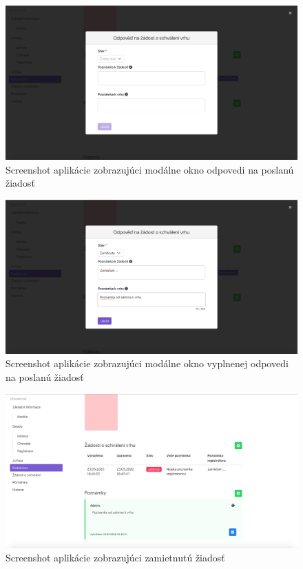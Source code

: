 \vspace*{\fill}

\begin{figure}[H]
	\includegraphics[width=1.0\textwidth]{media/priloha/vrh/ziadost/3.png}
	\caption{Screenshot aplikácie zobrazujúci modálne okno odpovedi na poslanú žiadosť}
\end{figure}

\begin{figure}[H]
	\includegraphics[width=1.0\textwidth]{media/priloha/vrh/ziadost/4.png}
	\caption{Screenshot aplikácie zobrazujúci modálne okno vyplnenej odpovedi na poslanú žiadosť}
\end{figure}

\vspace*{\fill}

\begin{figure}[H]
	\includegraphics[width=1.0\textwidth]{media/priloha/vrh/ziadost/5.png}
	\caption{Screenshot aplikácie zobrazujúci zamietnutú žiadosť}
\end{figure}

